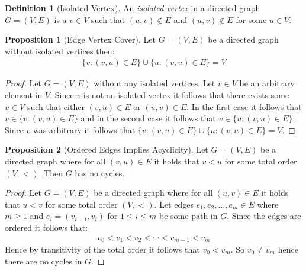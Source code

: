 \documentclass[a4paper,12pt]{article}
\theoremstyle{definition}
\newtheorem{definition}{Definition}[section]
\newtheorem{proposition}{Proposition}[section]
\begin{document}
\begin{definition}[Isolated Vertex]
    An \emph{isolated vertex} in a directed graph $G = (V, E)$ is a $v \in V$
    such that $(u, v) \notin E$ and $(u, v) \notin E$ for some $u \in V$.
\end{definition}
\begin{proposition}[Edge Vertex Cover]
    Let $G = (V, E)$ be a directed graph without isolated vertices then:
    \begin{align*}
        \{v : (v, u) \in E\} \cup \{u : (v, u) \in E\} = V
    \end{align*}
\end{proposition}
\begin{proof}
    Let $G = (V, E)$ without any isolated vertices. Let $v \in V$ be an
    arbitrary element in $V$. Since $v$ is not an isolated vertex it follows
    that there exists some $u \in V$ such that either $(v, u) \in E$ or $(u, v)
    \in E$. In the first case it follows that $v \in \{v : (v, u) \in E\}$ and
    in the second case it follows that $v \in \{u : (v, u) \in E\}$. Since $v$
    was arbitrary it follows that $\{v : (v, u) \in E\} \cup \{u : (v, u) \in
    E\} = V$.
\end{proof}

\begin{proposition}[Ordered Edges Implies Acyclicity]
    Let $G = (V, E)$ be a directed graph where for all $(v, u) \in E$ it holds
    that $v < u$ for some total order $(V, <)$. Then $G$ has no cycles.
\end{proposition}

\begin{proof}
    Let $G = (V, E)$ be a directed graph where for all $(u, v) \in E$ it holds
    that $u < v$ for some total order $(V, <)$. Let edges $e_1, e_2, \ldots, e_m
    \in E$ where $m \geq 1$ and $e_i = (v_{i-1}, v_i)$ for $1 \leq i \leq m$ be
    some path in $G$. Since the edges are ordered it follows that:
    \begin{align*}
        v_0 < v_1 < v_2 < \cdots < v_{m - 1} < v_m
    \end{align*}
    Hence by transitivity of the total order it follows that $v_0 < v_m$. So
    $v_0 \neq v_m$ hence there are no cycles in $G$.
\end{proof}
\end{document}
